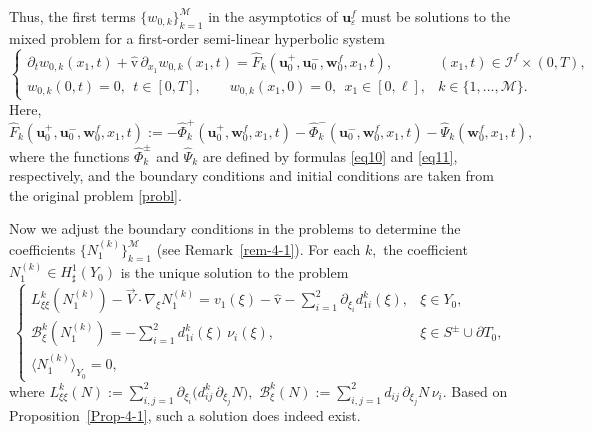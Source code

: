 \documentclass[reqno]{amsart}            %
\numberwithin{equation}{section}
\begin{document}
	Thus, the first terms $\{w_{0,k}\}_{k=1}^\mathcal{M}$ in the asymptotics of $\mathbf{u}^f_\varepsilon$ must be solutions to the mixed problem for a first-order semi-linear hyperbolic system  
	\begin{equation}\label{hyperbolic-system}
		\left\{
		\begin{array}{ll}
			\partial_t w_{0,k}(x_1,t)  + \hat{\mathrm{v}} \, \partial_{x_1} w_{0,k}(x_1,t) = \widehat{F}_k(\mathbf{u}^+_0, \mathbf{u}^-_0, \mathbf{w}^f_0, x_1, t), &
			(x_1,t) \in \mathcal{I}^f\times (0,T),
			\\[3pt]
			w_{0,k}(0,t)= 0, \ \ t\in [0,T], \qquad w_{0,k}(x_1,0)= 0, \ \ x_1\in [0, \ell],
			& k\in \{1,\ldots,\mathcal{M}\}.
		\end{array}
		\right.
	\end{equation}
	Here,
	\begin{equation}\label{hat F}
		\widehat{F}_k(\mathbf{u}^+_0, \mathbf{u}^-_0, \mathbf{w}^f_0, x_1, t) := -  \widehat{\Phi}^+_k(\mathbf{u}^+_0, \mathbf{w}^f_0, x_1, t)
		- \widehat{\Phi}^-_k(\mathbf{u}^-_0, \mathbf{w}^f_0, x_1, t) - \widehat{\Psi}_k(\mathbf{w}^f_0, x_1, t),
	\end{equation}
	where the functions $\widehat{\Phi}^\pm_k$ and  $\widehat{\Psi}_k$ are defined by formulas \eqref{eq10} and \eqref{eq11}, respectively,  
	and the boundary conditions and initial conditions are taken from the original problem \eqref{probl}.
	
	
	Now we adjust the boundary conditions in the problems to determine the coefficients $\{N_1^{(k)}\}_{k=1}^\mathcal{M}$ (see Remark~\ref{rem-4-1}). For each $k,$ the coefficient $N_1^{(k)} \in H^1_\sharp(Y_0)$ is the unique solution to the problem
	\begin{equation}\label{problem-N-1}
		\left\{
		\begin{array}{ll}
			L^k_{\xi\xi}(N_1^{(k)})  - \overrightarrow{V} \cdot \nabla_{\xi}N_1^{(k)} = v_1(\xi) - \hat{\mathrm{v}}
			- \sum_{i=1}^{2} \partial_{\xi_i} d^k_{1 i}(\xi), & \xi \in Y_0, 
			\\[3pt]
			\mathcal{B}^k_{\xi}(N_1^{(k)}) =  - \sum_{i=1}^{2}d^k_{1 i}(\xi)\, \nu_i(\xi),
			&  \xi \in S^{\pm} \cup \partial T_0,
			\\[3pt]
			\langle N_1^{(k)}\rangle_{Y_0}= 0, & 
		\end{array}
		\right.
	\end{equation}
	where $L^k_{\xi\xi}(N) := \sum_{i, j =1}^{2} \partial_{\xi_i}\big(d^k_{i j}\, \partial_{\xi_j}N\big),$
	$\mathcal{B}^k_\xi(N) := \sum_{i, j =1}^{2} d_{i j}\, \partial_{\xi_j}N\, \nu_i.$ Based on Proposition~\ref{Prop-4-1}, such a solution does indeed exist.
	
\end{document}
